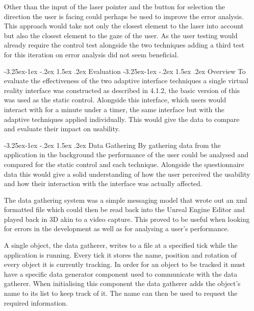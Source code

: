 \documentclass[12pt]{article}
\makeatletter
\renewcommand{\subsection}{\@startsection{subsection}{2}{\z@}%
             {-3.25ex\@plus -1ex \@minus -.2ex}%
             {1.5ex \@plus .2ex}%
             {\normalfont\large\scshape\bfseries}}
\renewcommand{\subsubsection}{\@startsection{subsubsection}{2}{\z@}%
             {-3.25ex\@plus -1ex \@minus -.2ex}%
             {1.5ex \@plus .2ex}%
             {\normalfont\normalsize\scshape\bfseries}}
\makeatother
\begin{document}
Other than the input of the laser pointer and the button for selection the direction the user is facing could perhaps be used to improve the error analysis. This approach would take not only the closest element to the laser into account but also the closest element to the gaze of the user. As the user testing would already require the control test alongside the two techniques adding a third test for this iteration on error analysis did not seem beneficial.

\subsection{Evaluation}
\subsubsection{Overview}
To evaluate the effectiveness of the two adaptive interface techniques a single virtual reality interface was constructed as described in 4.1.2, the basic version of this was used as the static control. Alongside this interface, which users would interact with for a minute under a timer, the same interface but with the adaptive techniques applied individually. This would give the data to compare and evaluate their impact on usability.

\subsubsection{Data Gathering}
By gathering data from the application in the background the performance of the user could be analysed and compared for the static control and each technique. Alongside the questionnaire data this would give a solid understanding of how the user perceived the usability and how their interaction with the interface was actually affected.

The data gathering system was a simple messaging model that wrote out an xml formatted file which could then be read back into the Unreal Engine Editor and played back in 3D akin to a video capture. This proved to be useful when looking for errors in the development as well as for analysing a user's performance.

A single object, the data gatherer, writes to a file at a specified tick while the application is running. Every tick it stores the name, position and rotation of every object it is currently tracking. In order for an object to be tracked it must have a specific data generator component used to communicate with the data gatherer. When initialising this component the data gatherer adds the object's name to its list to keep track of it. The name can then be used to request the required information.
\end{document}
